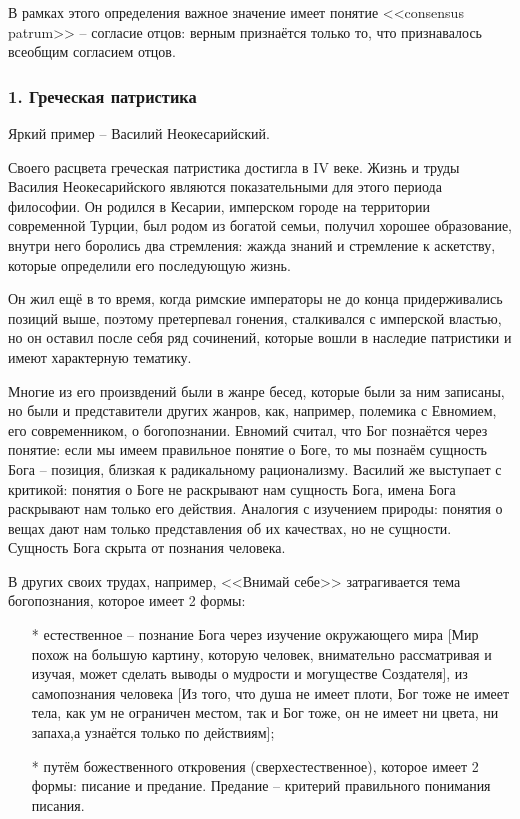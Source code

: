 \documentclass[a4paper, 12pt]{book} %
\begin{document}
В рамках этого определения важное значение имеет понятие <<consensus patrum>> -- согласие отцов: верным признаётся только то, что признавалось всеобщим согласием отцов.

\subsubsection*{1. Греческая патристика}
Яркий пример -- Василий Неокесарийский.

Своего расцвета греческая патристика достигла в IV веке. Жизнь и труды Василия Неокесарийского являются показательными для этого периода философии. Он родился в Кесарии, имперском городе на территории современной Турции, был родом из богатой семьи, получил хорошее образование, внутри него боролись два стремления: жажда знаний и стремление к аскетству, которые определили его последующую жизнь.

Он жил ещё в то время, когда римские императоры не до конца придерживались позиций выше, поэтому претерпевал гонения, сталкивался с имперской властью, но он оставил после себя ряд сочинений, которые вошли в наследие патристики и имеют характерную тематику. 

Многие из его произвдений были в жанре бесед, которые были за ним записаны, но были и представители других жанров, как, например, полемика с Евномием, его современником, о богопознании. Евномий считал, что Бог познаётся через понятие: если мы имеем правильное понятие о Боге, то мы познаём сущность Бога -- позиция, близкая к радикальному рационализму. Василий же выступает с критикой: понятия о Боге не раскрывают нам сущность Бога, имена Бога раскрывают нам только его действия. Аналогия с изучением природы: понятия о вещах дают нам только представления об их качествах, но не сущности. Сущность Бога скрыта от познания человека. 

В других своих трудах, например, <<Внимай себе>> затрагивается тема богопознания, которое имеет 2 формы:
\begin{itemize}
\item[*] естественное -- познание Бога через изучение окружающего мира [Мир похож на большую картину, которую человек, внимательно рассматривая и изучая, может сделать выводы о мудрости и могуществе Создателя], из самопознания человека [Из того, что душа не имеет плоти, Бог тоже не имеет тела, как ум не ограничен местом, так и Бог тоже, он не имеет ни цвета, ни запаха,а узнаётся только по действиям]; 
\item[*] путём божественного откровения (сверхестественное), которое имеет 2 формы: писание и предание. Предание -- критерий правильного понимания писания.
\end{itemize}
\end{document}
